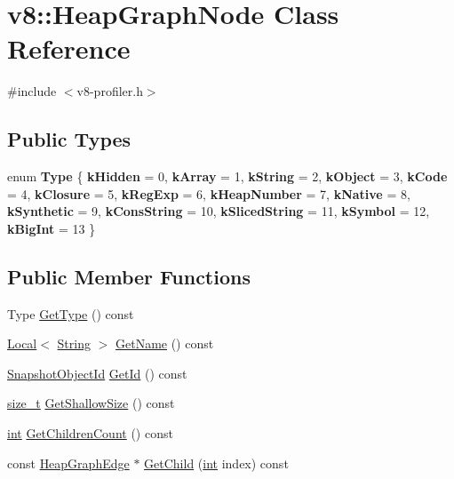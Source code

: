 \hypertarget{classv8_1_1HeapGraphNode}{}\section{v8\+:\+:Heap\+Graph\+Node Class Reference}
\label{classv8_1_1HeapGraphNode}


{\ttfamily \#include $<$v8-\/profiler.\+h$>$}

\subsection*{Public Types}
\begin{DoxyCompactItemize}
\item 
\mbox{\label{classv8_1_1HeapGraphNode_ab674a58103a51abc56f99edc6a1479ed}} 
enum {\bfseries Type} \{ \newline
{\bfseries k\+Hidden} = 0, 
{\bfseries k\+Array} = 1, 
{\bfseries k\+String} = 2, 
{\bfseries k\+Object} = 3, 
\newline
{\bfseries k\+Code} = 4, 
{\bfseries k\+Closure} = 5, 
{\bfseries k\+Reg\+Exp} = 6, 
{\bfseries k\+Heap\+Number} = 7, 
\newline
{\bfseries k\+Native} = 8, 
{\bfseries k\+Synthetic} = 9, 
{\bfseries k\+Cons\+String} = 10, 
{\bfseries k\+Sliced\+String} = 11, 
\newline
{\bfseries k\+Symbol} = 12, 
{\bfseries k\+Big\+Int} = 13
 \}
\end{DoxyCompactItemize}
\subsection*{Public Member Functions}
\begin{DoxyCompactItemize}
\item 
Type \mbox{\hyperlink{classv8_1_1HeapGraphNode_a93db89e657229ddc9820beb1b6dad046}{Get\+Type}} () const
\item 
\mbox{\hyperlink{classv8_1_1Local}{Local}}$<$ \mbox{\hyperlink{classv8_1_1String}{String}} $>$ \mbox{\hyperlink{classv8_1_1HeapGraphNode_a030f9646498eec5f689c8f6c8fe09168}{Get\+Name}} () const
\item 
\mbox{\hyperlink{classuint32__t}{Snapshot\+Object\+Id}} \mbox{\hyperlink{classv8_1_1HeapGraphNode_a62cd677be9c23067c6e2394b1fd154c6}{Get\+Id}} () const
\item 
\mbox{\hyperlink{classsize__t}{size\+\_\+t}} \mbox{\hyperlink{classv8_1_1HeapGraphNode_ad61965a12cabdc7a4eeeb7e6aade46ba}{Get\+Shallow\+Size}} () const
\item 
\mbox{\hyperlink{classint}{int}} \mbox{\hyperlink{classv8_1_1HeapGraphNode_afb0afb27e5d5ae27b54376bc69f095ae}{Get\+Children\+Count}} () const
\item 
const \mbox{\hyperlink{classv8_1_1HeapGraphEdge}{Heap\+Graph\+Edge}} $\ast$ \mbox{\hyperlink{classv8_1_1HeapGraphNode_ad3a8d2b97d9ffbdafc5c0b23f20427cf}{Get\+Child}} (\mbox{\hyperlink{classint}{int}} index) const
\end{DoxyCompactItemize}


